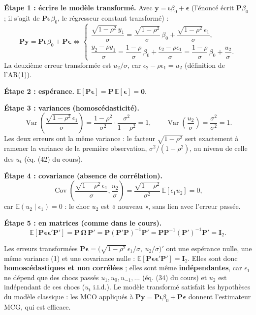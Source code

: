 \documentclass[11pt,a4paper]{article}
\newcommand{\vy}{\mathbf{y}}\newcommand{\vX}{\mathbf{X}}\newcommand{\vi}{\bm{\iota}}
\newcommand{\veps}{\bm{\epsilon}}\newcommand{\vu}{\mathbf{u}}\newcommand{\vbeta}{\bm{\beta}}
\newcommand{\I}{\mathbf{I}}\newcommand{\Pm}{\mathbf{P}}\newcommand{\Om}{\bm{\Omega}}
\newcommand{\E}{\mathbb{E}}\newcommand{\Var}{\operatorname{Var}}\newcommand{\Cov}{\operatorname{Cov}}
\begin{document}
\textbf{Étape 1 : écrire le modèle transformé.} Avec $\vy=\vi\beta_0+\veps$ (l'énoncé écrit $\Pm\beta_0$ ; il s'agit de $\Pm\vi\,\beta_0$, le régresseur constant transformé) :
\[
\Pm\vy=\Pm\vi\,\beta_0+\Pm\veps\iff
\begin{cases}
\dfrac{\sqrt{1-\rho^2}\,y_1}{\sigma}=\dfrac{\sqrt{1-\rho^2}}{\sigma}\,\beta_0+\dfrac{\sqrt{1-\rho^2}\,\epsilon_1}{\sigma},\\[3mm]
\dfrac{y_2-\rho y_1}{\sigma}=\dfrac{1-\rho}{\sigma}\,\beta_0+\dfrac{\epsilon_2-\rho\epsilon_1}{\sigma}=\dfrac{1-\rho}{\sigma}\,\beta_0+\dfrac{u_2}{\sigma}.
\end{cases}
\]
La deuxième erreur transformée est $u_2/\sigma$, car $\epsilon_2-\rho\epsilon_1=u_2$ (définition de l'AR(1)).

\textbf{Étape 2 : espérance.} $\E[\Pm\veps]=\Pm\,\E[\veps]=\mathbf 0$.

\textbf{Étape 3 : variances (homoscédasticité).}
\[
\Var\!\left(\frac{\sqrt{1-\rho^2}\,\epsilon_1}{\sigma}\right)=\frac{1-\rho^2}{\sigma^2}\cdot\frac{\sigma^2}{1-\rho^2}=1,
\qquad
\Var\!\left(\frac{u_2}{\sigma}\right)=\frac{\sigma^2}{\sigma^2}=1 .
\]
Les deux erreurs ont la même variance : le facteur $\sqrt{1-\rho^2}$ sert exactement à ramener la variance de la première observation, $\sigma^2/(1-\rho^2)$, au niveau de celle des $u_t$ (éq. (42) du cours).

\textbf{Étape 4 : covariance (absence de corrélation).}
\[
\Cov\!\left(\frac{\sqrt{1-\rho^2}\,\epsilon_1}{\sigma},\frac{u_2}{\sigma}\right)=\frac{\sqrt{1-\rho^2}}{\sigma^2}\,\E[\epsilon_1u_2]=0,
\]
car $\E(u_2\mid\epsilon_1)=0$ : le choc $u_2$ est « nouveau », sans lien avec l'erreur passée.

\textbf{Étape 5 : en matrices (comme dans le cours).}
\[
\E[\Pm\veps\veps'\Pm']=\Pm\,\Om\,\Pm'=\Pm(\Pm'\Pm)^{-1}\Pm'=\Pm\Pm^{-1}(\Pm')^{-1}\Pm'=\I_2 .
\]

\begin{reponse}
Les erreurs transformées $\Pm\veps=\big(\sqrt{1-\rho^2}\,\epsilon_1/\sigma,\ u_2/\sigma\big)'$ ont une espérance nulle, une même variance (1) et une covariance nulle : $\E[\Pm\veps\veps'\Pm']=\I_2$. Elles sont donc \textbf{homoscédastiques et non corrélées} ; elles sont même \textbf{indépendantes}, car $\epsilon_1$ ne dépend que des chocs passés $u_1,u_0,u_{-1},\dots$ (éq. (34) du cours) et $u_2$ est indépendant de ces chocs ($u_t$ i.i.d.). Le modèle transformé satisfait les hypothèses du modèle classique : les MCO appliqués à $\Pm\vy=\Pm\vi\beta_0+\Pm\veps$ donnent l'estimateur MCG, qui est efficace.
\end{reponse}
\end{document}
